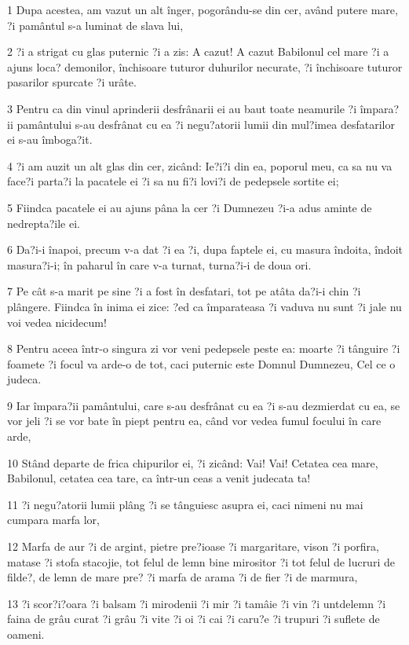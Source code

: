 \par 1 Dupa acestea, am vazut un alt înger, pogorându-se din cer, având putere mare, ?i pamântul s-a luminat de slava lui,
\par 2 ?i a strigat cu glas puternic ?i a zis: A cazut! A cazut Babilonul cel mare ?i a ajuns loca? demonilor, închisoare tuturor duhurilor necurate, ?i închisoare tuturor pasarilor spurcate ?i urâte.
\par 3 Pentru ca din vinul aprinderii desfrânarii ei au baut toate neamurile ?i împara?ii pamântului s-au desfrânat cu ea ?i negu?atorii lumii din mul?imea desfatarilor ei s-au îmboga?it.
\par 4 ?i am auzit un alt glas din cer, zicând: Ie?i?i din ea, poporul meu, ca sa nu va face?i parta?i la pacatele ei ?i sa nu fi?i lovi?i de pedepsele sortite ei;
\par 5 Fiindca pacatele ei au ajuns pâna la cer ?i Dumnezeu ?i-a adus aminte de nedrepta?ile ei.
\par 6 Da?i-i înapoi, precum v-a dat ?i ea ?i, dupa faptele ei, cu masura îndoita, îndoit masura?i-i; în paharul în care v-a turnat, turna?i-i de doua ori.
\par 7 Pe cât s-a marit pe sine ?i a fost în desfatari, tot pe atâta da?i-i chin ?i plângere. Fiindca în inima ei zice: ?ed ca împarateasa ?i vaduva nu sunt ?i jale nu voi vedea nicidecum!
\par 8 Pentru aceea într-o singura zi vor veni pedepsele peste ea: moarte ?i tânguire ?i foamete ?i focul va arde-o de tot, caci puternic este Domnul Dumnezeu, Cel ce o judeca.
\par 9 Iar împara?ii pamântului, care s-au desfrânat cu ea ?i s-au dezmierdat cu ea, se vor jeli ?i se vor bate în piept pentru ea, când vor vedea fumul focului în care arde,
\par 10 Stând departe de frica chipurilor ei, ?i zicând: Vai! Vai! Cetatea cea mare, Babilonul, cetatea cea tare, ca într-un ceas a venit judecata ta!
\par 11 ?i negu?atorii lumii plâng ?i se tânguiesc asupra ei, caci nimeni nu mai cumpara marfa lor,
\par 12 Marfa de aur ?i de argint, pietre pre?ioase ?i margaritare, vison ?i porfira, matase ?i stofa stacojie, tot felul de lemn bine mirositor ?i tot felul de lucruri de filde?, de lemn de mare pre? ?i marfa de arama ?i de fier ?i de marmura,
\par 13 ?i scor?i?oara ?i balsam ?i mirodenii ?i mir ?i tamâie ?i vin ?i untdelemn ?i faina de grâu curat ?i grâu ?i vite ?i oi ?i cai ?i caru?e ?i trupuri ?i suflete de oameni.
